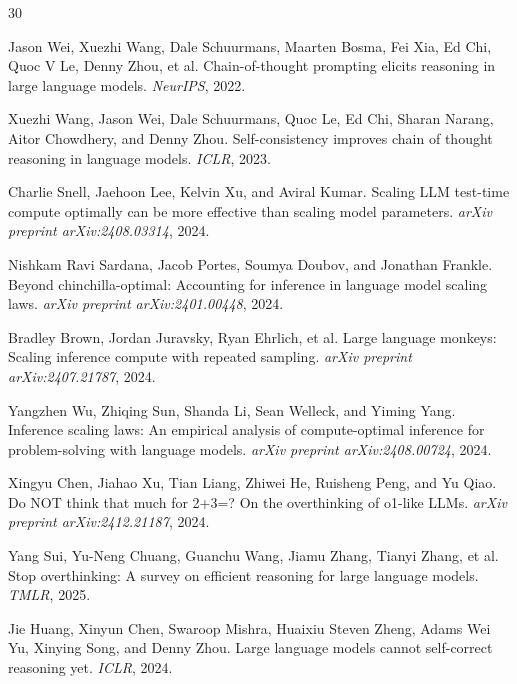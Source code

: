 \documentclass{article}
\begin{document}

\begin{thebibliography}{30}

Jason Wei, Xuezhi Wang, Dale Schuurmans, Maarten Bosma, Fei Xia, Ed Chi, Quoc V Le, Denny Zhou, et al.
\newblock Chain-of-thought prompting elicits reasoning in large language models.
\newblock \emph{NeurIPS}, 2022.

Xuezhi Wang, Jason Wei, Dale Schuurmans, Quoc Le, Ed Chi, Sharan Narang, Aitor Chowdhery, and Denny Zhou.
\newblock Self-consistency improves chain of thought reasoning in language models.
\newblock \emph{ICLR}, 2023.

Charlie Snell, Jaehoon Lee, Kelvin Xu, and Aviral Kumar.
\newblock Scaling LLM test-time compute optimally can be more effective than scaling model parameters.
\newblock \emph{arXiv preprint arXiv:2408.03314}, 2024.

Nishkam Ravi Sardana, Jacob Portes, Soumya Doubov, and Jonathan Frankle.
\newblock Beyond chinchilla-optimal: Accounting for inference in language model scaling laws.
\newblock \emph{arXiv preprint arXiv:2401.00448}, 2024.

Bradley Brown, Jordan Juravsky, Ryan Ehrlich, et al.
\newblock Large language monkeys: Scaling inference compute with repeated sampling.
\newblock \emph{arXiv preprint arXiv:2407.21787}, 2024.

Yangzhen Wu, Zhiqing Sun, Shanda Li, Sean Welleck, and Yiming Yang.
\newblock Inference scaling laws: An empirical analysis of compute-optimal inference for problem-solving with language models.
\newblock \emph{arXiv preprint arXiv:2408.00724}, 2024.

Xingyu Chen, Jiahao Xu, Tian Liang, Zhiwei He, Ruisheng Peng, and Yu Qiao.
\newblock Do NOT think that much for 2+3=? On the overthinking of o1-like LLMs.
\newblock \emph{arXiv preprint arXiv:2412.21187}, 2024.

Yang Sui, Yu-Neng Chuang, Guanchu Wang, Jiamu Zhang, Tianyi Zhang, et al.
\newblock Stop overthinking: A survey on efficient reasoning for large language models.
\newblock \emph{TMLR}, 2025.

Jie Huang, Xinyun Chen, Swaroop Mishra, Huaixiu Steven Zheng, Adams Wei Yu, Xinying Song, and Denny Zhou.
\newblock Large language models cannot self-correct reasoning yet.
\newblock \emph{ICLR}, 2024.


\end{thebibliography}
\end{document}
